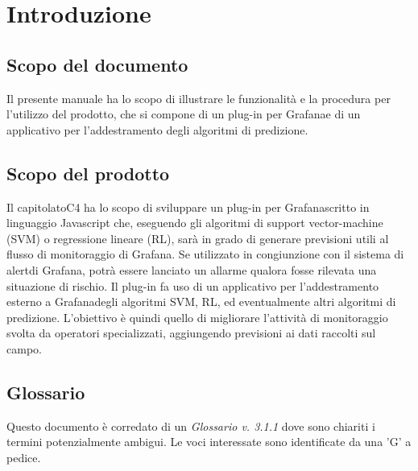 \section{Introduzione}
	\subsection{Scopo del documento}
		Il presente manuale ha lo scopo di illustrare le funzionalità e la procedura per l'utilizzo del prodotto\glo, che si compone di un plug-in per Grafana\glosp e di un applicativo per l'addestramento degli algoritmi di predizione.
	\subsection{Scopo del prodotto}
		Il capitolato\glosp C4 ha lo scopo di sviluppare un plug-in per Grafana\glosp scritto in linguaggio Javascript che, eseguendo gli algoritmi di support vector-machine (SVM\glo) o regressione lineare (RL\glo), sarà in grado di generare previsioni utili al flusso di monitoraggio di Grafana\glo. Se utilizzato in congiunzione con il sistema di alert\glosp di Grafana\glo, potrà essere lanciato un allarme qualora fosse rilevata una situazione di rischio.
		Il plug-in fa uso di un applicativo per l'addestramento esterno a Grafana\glosp degli algoritmi SVM\glosp, RL\glosp, ed eventualmente altri algoritmi di predizione. L'obiettivo è quindi quello di migliorare l'attività di monitoraggio svolta da operatori specializzati, aggiungendo previsioni ai dati raccolti sul campo.
	\subsection{Glossario}
		Questo documento è corredato di un \textit{Glossario v. 3.1.1} dove sono chiariti i termini potenzialmente ambigui. Le voci interessate sono identificate da una 'G' a pedice.
